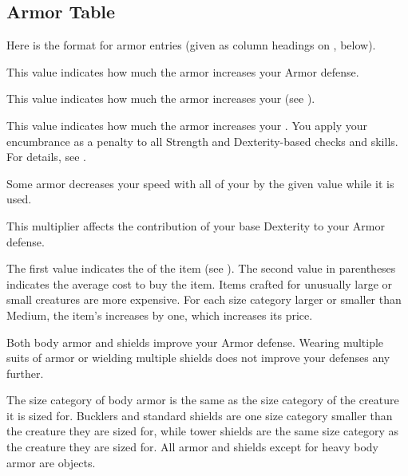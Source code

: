     \subsection{Armor Table}
        \par Here is the format for armor entries (given as column headings on , below).

         This value indicates how much the armor increases your Armor defense.

         This value indicates how much the armor increases your  (see ).

         This value indicates how much the armor increases your .
        You apply your encumbrance as a penalty to all Strength and Dexterity-based checks and skills.
        For details, see .

         Some armor decreases your speed with all of your  by the given value while it is used.

         This multiplier affects the contribution of your base Dexterity to your Armor defense.

         The first value indicates the  of the item (see ).
        The second value in parentheses indicates the average cost to buy the item.
        Items crafted for unusually large or small creatures are more expensive.
        For each size category larger or smaller than Medium, the item's  increases by one, which increases its price.

         Both body armor and shields improve your Armor defense.
        Wearing multiple suits of armor or wielding multiple shields does not improve your defenses any further.

         The size category of body armor is the same as the size category of the creature it is sized for.
        Bucklers and standard shields are one size category smaller than the creature they are sized for, while tower shields are the same size category as the creature they are sized for.
        All armor and shields except for heavy body armor are  objects.


